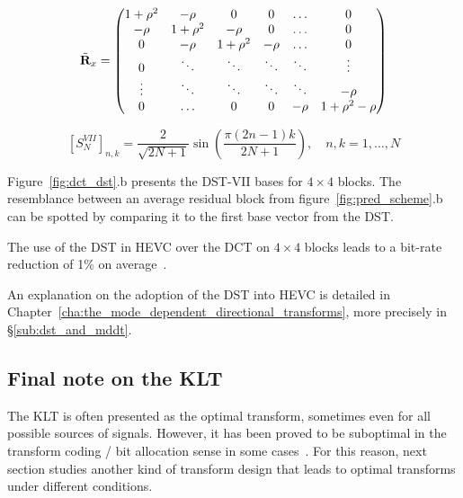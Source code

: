 \documentclass[11pt,a4paper,openright,twoside]{book}
\numberwithin{equation}{section} %
\numberwithin{figure}{section} %
\numberwithin{table}{section} %
\begin{document}
\begin{equation}
	\tilde{\mathbf{R}}_x =
	\begin{pmatrix}
		1+\rho^2 & -\rho    & 0        & 0      & \hdots & 0            \\
		-\rho    & 1+\rho^2 & -\rho    & 0      & \hdots & 0            \\
		0        & -\rho    & 1+\rho^2 & -\rho  & \hdots & 0            \\
		0        & \ddots   & \ddots   & \ddots & \ddots & \vdots       \\
		\vdots   & \ddots   & \ddots   & \ddots & \ddots & -\rho        \\
		0        & \hdots   & 0        & 0      & -\rho  & 1+\rho^2-\rho
	\end{pmatrix}
	\label{eqn:tridiagonal_matrix}
\end{equation}

\begin{equation}
	{\left[S_{N}^{VII} \right]}_{n,k} =
	\frac{2}{\sqrt{2N+1}}\sin\left(\frac{\pi(2n-1)k}{2N+1}\right),
	\quad
	n,k = 1, \dots, N
	\label{eqn:dst_vii}
\end{equation}

Figure~\ref{fig:dct_dst}.b presents the \ac{DST}-VII bases for
$4\times4$ blocks.
The resemblance between an average residual block from
figure~\ref{fig:pred_scheme}.b can be spotted by comparing it to the first
base vector from the \ac{DST}.

The use of the \ac{DST} in \ac{HEVC} over the \ac{DCT} on $4\times4$
blocks leads to a bit-rate reduction of 1\% on
average~\cite{sullivan-12-overview-hevc}.

An explanation on the adoption of the \ac{DST} into \ac{HEVC} is detailed in
Chapter~\ref{cha:the_mode_dependent_directional_transforms}, more precisely in
\S\ref{sub:dst_and_mddt}.

\subsection{Final note on the \ac{KLT}}
\label{sub:final_note_on_the_klt}

The \ac{KLT} is often presented as the optimal transform, sometimes even for
all possible sources of signals.
However, it has been proved to be suboptimal in the transform coding / bit
allocation sense in some cases~\cite{effros-04-suboptimal-klt}.
For this reason, next section studies another kind of transform design that
leads to optimal transforms under different conditions.
\end{document}
